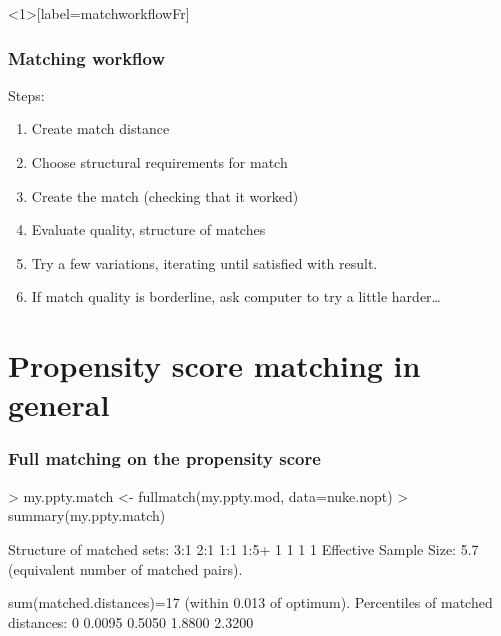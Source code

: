 
\begin{frame}<1>[label=matchworkflowFr]
  \frametitle{Matching workflow}
Steps:
    \begin{enumerate}
    \item Create match distance
    \item Choose structural requirements for match
    \item Create the match (checking that it worked)
    \item Evaluate quality, structure of matches
    \item Try a few variations, iterating until satisfied with result.\\[12ex]
    \item<2-> If match quality is borderline, ask computer to try a little harder\ldots
    \end{enumerate}

\end{frame}



\section{Propensity score matching in general}


\begin{frame}[fragile]
  \frametitle{Full matching on the propensity score}

\begin{Schunk}
\begin{Sinput}
> my.ppty.match <- fullmatch(my.ppty.mod, data=nuke.nopt)
> summary(my.ppty.match)
\end{Sinput}
\begin{Soutput}
Structure of matched sets:
 3:1  2:1  1:1 1:5+ 
   1    1    1    1 
Effective Sample Size:  5.7 
(equivalent number of matched pairs).

sum(matched.distances)=17
(within 0.013 of optimum).
Percentiles of matched distances:
    0%    50%    95%   100% 
0.0095 0.5050 1.8800 2.3200 
\end{Soutput}
\end{Schunk}


\end{frame}

